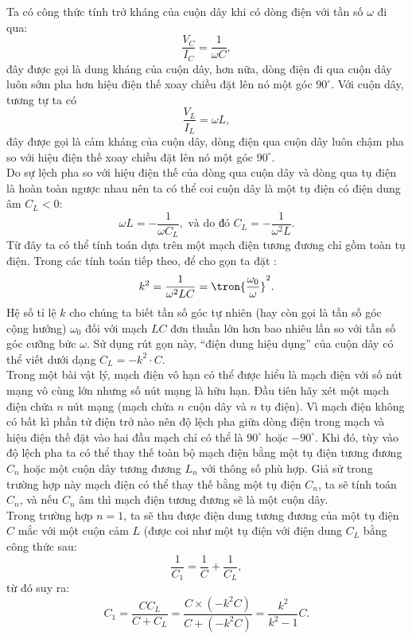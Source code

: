 \begin{vd}
\begin{center}
\begin{tikzpicture}[x=0.75pt,y=0.75pt,yscale=-1,xscale=1]
\end{tikzpicture}
\end{center}
\end{vd}
\begin{loigiai}\[\]
Ta có công thức tính trở kháng của cuộn dây khi có dòng điện với tần số $\omega$ đi qua:
$$\dfrac{V_C}{I_C}=\dfrac{1}{\omega C},$$
đây được gọi là dung kháng của cuộn dây, hơn nữa, dòng điện đi qua cuộn dây luôn sớm pha hơn hiệu điện thế xoay chiều đặt lên nó một góc $90^\circ$. Với cuộn dây, tương tự ta có
$$\dfrac{V_L}{I_L}=\omega L,$$
đây được gọi là cảm kháng của cuộn dây, dòng điện qua cuộn dây luôn chậm pha so với hiệu điện thế xoay chiều đặt lên nó một góc $90^\circ.$\\
Do sự lệch pha so với hiệu điện thế của dòng qua cuộn dây và dòng qua tụ điện là hoàn toàn ngược nhau nên ta có thể coi cuộn dây là một tụ điện có điện dung âm $C_L<0$:
$$\omega L=-\dfrac{1}{\omega C_L}, \text{ và do đó } C_L=-\dfrac{1}{\omega^2 L}.$$
Từ đây ta có thể tính toán dựa trên một mạch điện tương đương chỉ gồm toàn tụ điện.
Trong các tính toán tiếp theo, để cho gọn ta đặt :
$$k^2=\dfrac{1}{\omega^2 LC}=\tron{\dfrac{\omega_0}{\omega}}^2.$$
Hệ số tỉ lệ $k$ cho chúng ta biết tần số góc tự nhiên (hay còn gọi là tần số góc cộng hưởng) $\omega_0$ đối với mạch $LC$ đơn thuần lớn hơn bao nhiêu lần so với tần số  góc cưỡng bức $\omega$. Sử dụng rút gọn này, “điện dung hiệu dụng” của cuộn dây có thể viết dưới dạng $C_L=-k^2\cdot C$.\\
Trong một bài vật lý, mạch điện vô hạn có thể được hiểu là mạch điện với số nút mạng vô cùng lớn nhưng số nút mạng là hữu hạn. Đầu tiên hãy xét một mạch điện chứa $n$ nút mạng (mạch chứa $n$ cuộn dây và $n$ tụ điện). Vì mạch điện không có bất kì phần tử điện trở nào nên độ lệch pha giữa dòng điện trong mạch và hiệu điện thế đặt vào hai đầu mạch chỉ có thể là $90^\circ$ hoặc $-90^\circ$. Khi đó, tùy vào độ lệch pha ta có thể thay thế toàn bộ mạch điện bằng một tụ điện tương đương $C_n$ hoặc một cuộn dây tương đương $L_n$ với thông số phù hợp. Giả sử trong trường hợp này mạch điện có thể thay thế bằng một tụ điện $C_n$, ta sẽ tính toán  $C_n$, và nếu $C_n$ âm thì mạch điện tương đương sẽ là một cuộn dây.\\
Trong trường hợp $n=1$, ta sẽ thu được điện dung tương đương của một tụ điện $C$ mắc với một cuộn cảm $L$ (được coi như một tụ điện với điện dung $C_L$ bằng công thức sau:
$$\dfrac{1}{C_1}=\dfrac{1}{C}+\dfrac{1}{C_L},$$
từ đó suy ra:
$$C_{1}=\dfrac{C C_{L}}{C+C_{L}}=\dfrac{C \times\left(-k^{2} C\right)}{C+\left(-k^{2} C\right)}=\dfrac{k^{2}}{k^{2}-1} C .$$

\end{loigiai}
